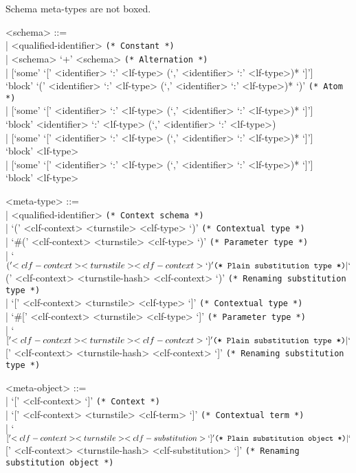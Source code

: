 \documentclass[11pt]{article}
\begin{document}
Schema meta-types are not boxed.

\begin{grammar}
<schema> ::= \hfill\\
| <qualified-identifier> \hfill \texttt{(* Constant *)}\\
| <schema> `+' <schema> \hfill \texttt{(* Alternation *)}\\
| [`some' `[' <identifier> `:' <lf-type> (`,' <identifier> `:' <lf-type>)* `]']\\
  `block' `(' <identifier> `:' <lf-type> (`,' <identifier> `:' <lf-type>)* `)' \hfill \texttt{(* Atom *)}\\
| [`some' `[' <identifier> `:' <lf-type> (`,' <identifier> `:' <lf-type>)* `]']\\
  `block' <identifier> `:' <lf-type> (`,' <identifier> `:' <lf-type>)\\
| [`some' `[' <identifier> `:' <lf-type> (`,' <identifier> `:' <lf-type>)* `]']\\
  `block' <lf-type>\\
| [`some' `[' <identifier> `:' <lf-type> (`,' <identifier> `:' <lf-type>)* `]']\\
  `block' <lf-type>

<meta-type> ::= \hfill\\
| <qualified-identifier> \hfill \texttt{(* Context schema *)}\\
| `(' <clf-context> <turnstile> <clf-type> `)' \hfill \texttt{(* Contextual type *)}\\
| `#(' <clf-context> <turnstile> <clf-type> `)' \hfill \texttt{(* Parameter type *)}\\
| `$(' <clf-context> <turnstile> <clf-context> `)' \hfill \texttt{(* Plain substitution type *)}\\
| `$(' <clf-context> <turnstile-hash> <clf-context> `)' \hfill \texttt{(* Renaming substitution type *)}\\
| `[' <clf-context> <turnstile> <clf-type> `]' \hfill \texttt{(* Contextual type *)}\\
| `#[' <clf-context> <turnstile> <clf-type> `]' \hfill \texttt{(* Parameter type *)}\\
| `$[' <clf-context> <turnstile> <clf-context> `]' \hfill \texttt{(* Plain substitution type *)}\\
| `$[' <clf-context> <turnstile-hash> <clf-context> `]' \hfill \texttt{(* Renaming substitution type *)}

<meta-object> ::= \hfill\\
| `[' <clf-context> `]' \hfill \texttt{(* Context *)}\\
| `[' <clf-context> <turnstile> <clf-term> `]' \hfill \texttt{(* Contextual term *)}\\
| `$[' <clf-context> <turnstile> <clf-substitution> `]' \hfill \texttt{(* Plain substitution object *)}\\
| `$[' <clf-context> <turnstile-hash> <clf-substitution> `]' \hfill \texttt{(* Renaming substitution object *)}


\end{grammar}
\end{document}
